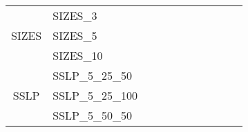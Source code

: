 \begin{table}[]
{\begin{tabular}{|c|l|ll|ll|ll|l|l|l|}
			\hline
			\multirow{3}{*}{SIZES}  & SIZES\_3                      &                                   &                                  &                           &                          &                           &                          &                                       &         &                       \\
			& SIZES\_5                      &                                   &                                  &                           &                          &                           &                          &                                       &                               & \\
			& SIZES\_10                     &                                   &                                  &                           &                          &                           &                          &                                       &                               & \\
			\hline
			\multirow{8}{*}{SSLP}  & SSLP\_5\_25\_50               &                                   &                                  &                           &                          &                           &                          &                                       &                               & \\
			& SSLP\_5\_25\_100              &                                   &                                  &                           &                          &                           &                          &                                       &                               & \\
			& SSLP\_5\_50\_50               &                                   &                                  &                           &                          &                           &                          &                                       &                               & \\

\end{tabular}}
\end{table}
